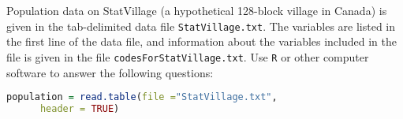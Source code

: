 \documentclass[boxes, qed]{homework}
\begin{document}
\newenvironment{amatrix}[1]{%
  \left[\begin{array}{@{}*{#1}{c}|c@{}}
}{%
  \end{array}\right]
}

\newenvironment{augmatrix}[1]{%
  \left[\begin{array}{#1}
}{%
  \end{array}\right]
}

\begin{problem}
\end{problem}
\begin{solution}
\end{solution}

\begin{problem}Population data on StatVillage (a hypothetical 128-block village in Canada) is given in
  the tab-delimited data file \texttt{StatVillage.txt}. The variables are listed in the first line of the data file, and
  information about the variables included in the file is given in the file \texttt{codesForStatVillage.txt}. 
  Use \texttt{R} or other computer software to answer the following questions:
  \begin{lstlisting}[backgroundcolor = \color{lightgray},language = R]
    population = read.table(file ="StatVillage.txt", 
      header = TRUE)
  \end{lstlisting}
\end{problem}
\end{document}
